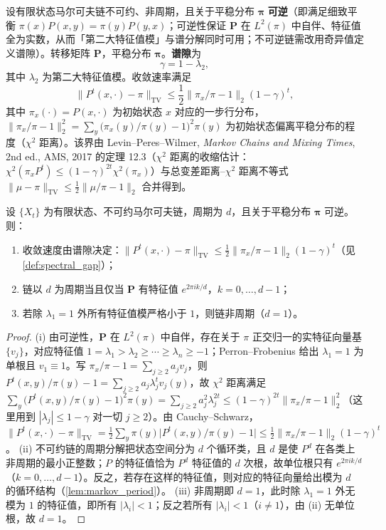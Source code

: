\begin{definition}[马尔可夫链的谱隙]\label{def:spectral_gap}
设有限状态马尔可夫链不可约、非周期，且关于平稳分布 $\boldsymbol\pi$ \textbf{可逆}（即满足细致平衡 $\pi(x)P(x,y)=\pi(y)P(y,x)$；可逆性保证 $\mathbf P$ 在 $L^2(\pi)$ 中自伴、特征值全为实数，从而「第二大特征值模」与谱分解同时可用；不可逆链需改用奇异值定义谱隙）。转移矩阵 $\mathbf P$，平稳分布 $\boldsymbol\pi$。\textbf{谱隙}为
\[
\gamma=1-\lambda_2,
\]
其中 $\lambda_2$ 为第二大特征值模。收敛速率满足
\[
\|P^t(x,\cdot)-\pi\|_{\mathrm{TV}}\le \frac12\|\pi_x/\pi-1\|_2(1-\gamma)^t,
\]
其中 $\pi_x(\cdot)=P(x,\cdot)$ 为初始状态 $x$ 对应的一步行分布，$\|\pi_x/\pi-1\|_2^2=\sum_y\bigl(\pi_x(y)/\pi(y)-1\bigr)^2\pi(y)$ 为初始状态偏离平稳分布的程度（$\chi^2$ 距离）。该界由 Levin--Peres--Wilmer, \textit{Markov Chains and Mixing Times}, 2nd ed., AMS, 2017 的定理 12.3（$\chi^2$ 距离的收缩估计：$\chi^2(\pi_xP^t)\le(1-\gamma)^{2t}\chi^2(\pi_x)$）与总变差距离--$\chi^2$ 距离不等式 $\|\mu-\pi\|_{\mathrm{TV}}\le\frac12\|\mu/\pi-1\|_2$ 合并得到。
\end{definition}

\begin{theorem}\label{thm:mcmc_convergence}
设 $\{X_t\}$ 为有限状态、不可约马尔可夫链，周期为 $d$，且关于平稳分布 $\boldsymbol\pi$ 可逆。则：
\begin{enumerate}[label=(\roman*)]
    \item 收敛速度由谱隙决定：$\|P^t(x,\cdot)-\pi\|_{\mathrm{TV}}\le\frac12\|\pi_x/\pi-1\|_2(1-\gamma)^t$（见 \cref{def:spectral_gap}）；
    \item 链以 $d$ 为周期当且仅当 $\mathbf P$ 有特征值 $e^{2\pi ik/d}$，$k=0,\dots,d-1$；
    \item 若除 $\lambda_1=1$ 外所有特征值模严格小于 $1$，则链非周期（$d=1$）。
\end{enumerate}
\end{theorem}

\begin{proof}
(i) 由可逆性，$\mathbf P$ 在 $L^2(\pi)$ 中自伴，存在关于 $\pi$ 正交归一的实特征向量基 $\{v_j\}$，对应特征值 $1=\lambda_1>\lambda_2\ge\cdots\ge\lambda_n\ge-1$；Perron--Frobenius 给出 $\lambda_1=1$ 为单根且 $v_1\equiv1$。写 $\pi_x/\pi-1=\sum_{j\ge2}a_jv_j$，则 $P^t(x,y)/\pi(y)-1=\sum_{j\ge2}a_j\lambda_j^tv_j(y)$，故 $\chi^2$ 距离满足 $\sum_y\bigl(P^t(x,y)/\pi(y)-1\bigr)^2\pi(y)=\sum_{j\ge2}a_j^2\lambda_j^{2t}\le(1-\gamma)^{2t}\|\pi_x/\pi-1\|_2^2$（这里用到 $|\lambda_j|\le1-\gamma$ 对一切 $j\ge2$）。由 Cauchy--Schwarz，$\|P^t(x,\cdot)-\pi\|_{\mathrm{TV}}=\frac12\sum_y\pi(y)\bigl|P^t(x,y)/\pi(y)-1\bigr|\le\frac12\|\pi_x/\pi-1\|_2(1-\gamma)^t$。
(ii) 不可约链的周期分解把状态空间分为 $d$ 个循环类，且 $d$ 是使 $P^d$ 在各类上非周期的最小正整数；$P$ 的特征值恰为 $P^d$ 特征值的 $d$ 次根，故单位根只有 $e^{2\pi ik/d}$（$k=0,\dots,d-1$）。反之，若存在这样的特征值，则对应的特征向量给出模为 $d$ 的循环结构（\cref{lem:markov_period}）。
(iii) 非周期即 $d=1$，此时除 $\lambda_1=1$ 外无模为 $1$ 的特征值，即所有 $|\lambda_i|<1$；反之若所有 $|\lambda_i|<1$（$i\ne1$），由 (ii) 无单位根，故 $d=1$。
\end{proof}

